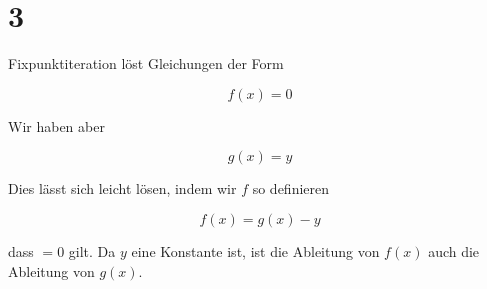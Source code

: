 \documentclass[ngerman,a4paper]{scrartcl}
\begin{document}
\section*{3}

Fixpunktiteration löst Gleichungen der Form

\[
f(x) = 0
\]

Wir haben aber

\[
g(x) = y
\]

Dies lässt sich leicht lösen, indem wir $f$ so definieren

\[
f(x) = g(x) - y
\]

dass $=0$ gilt. Da $y$ eine Konstante ist, ist die Ableitung von
$f(x)$ auch die Ableitung von $g(x)$.
\end{document}
